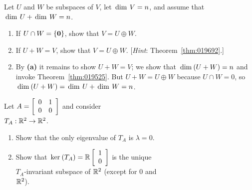 \begin{multicols}{2}
\begin{ex}
\begin{enumerate}[label={\alph*.}]
\end{enumerate}
\end{ex}

\begin{ex}
Let $U$ and $W$ be subspaces of $V$, let $\thinspace\operatorname{dim \medspace}V = n$, and assume that $\thinspace\operatorname{dim \medspace}U + \thinspace\operatorname{dim \medspace}W = n$.


\begin{enumerate}[label={\alph*.}]
\item If $U \cap W = \{\textbf{0}\}$, show that $V = U \oplus W$.

\item If $U + W = V$, show that $V = U \oplus W$. [\textit{Hint}: Theorem~\ref{thm:019692}.]

\end{enumerate}
\begin{sol}
\begin{enumerate}[label={\alph*.}]
\setcounter{enumi}{1}
\item By \textbf{(a)} it remains to show $U + W = V$; we show that $\thinspace\operatorname{dim\medspace}(U + W) = n$ and invoke Theorem~\ref{thm:019525}. But $U + W = U \oplus W$ because $U \cap W = 0$, so $\thinspace\operatorname{dim\medspace}(U + W) = \thinspace\operatorname{dim \medspace}U + \thinspace\operatorname{dim \medspace}W = n$.

\end{enumerate}
\end{sol}
\end{ex}

\begin{ex}
Let $A = \left[ \begin{array}{rr} 0 & 1 \\ 0 & 0 \end{array} \right]$ and consider \\$T_{A} : \mathbb{R}^2 \to \mathbb{R}^2$.


\begin{enumerate}[label={\alph*.}]
\item Show that the only eigenvalue of $T_{A}$ is $\lambda = 0$.

\item Show that $\thinspace\operatorname{ker \medspace}(T_A) = \mathbb{R}\left[ \begin{array}{c} 1 \\ 0 \end{array} \right]$ is the unique \\ $T_{A}$-invariant subspace of $\mathbb{R}^2$ (except for $0$ and \\ $\mathbb{R}^2$).


\end{enumerate}
\end{ex}
\end{multicols}
